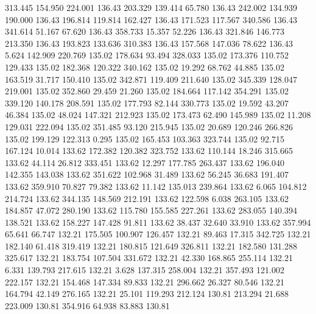  313.445  154.950  224.001       136.43
 203.329  139.414   65.780       136.43
 242.002  134.939  190.000       136.43
 196.814  119.814  162.427       136.43
 171.523  117.567  340.586       136.43
 341.614   51.167   67.620       136.43
 358.733   15.357   52.226       136.43
 321.846  146.773  213.350       136.43
 193.823  133.636  310.383       136.43
 157.568  147.036   78.622       136.43
   5.624  142.909  220.769       135.02
 178.634   93.494  328.033       135.02
 173.376  110.752  129.433       135.02
 182.368  120.322  340.162       135.02
  19.292   68.762   44.885       135.02
 163.519   31.717  150.410       135.02
 342.871  119.409  211.640       135.02
 345.339  128.047  219.001       135.02
 352.860   29.459   21.260       135.02
 184.664  117.142  354.291       135.02
 339.120  140.178  208.591       135.02
 177.793   82.144  330.773       135.02
  19.592   43.207   46.384       135.02
  48.024  147.321  212.923       135.02
 173.473   62.490  145.989       135.02
  11.208  129.031  222.094       135.02
 351.485   93.120  215.945       135.02
  20.689  120.246  266.826       135.02
 199.129  122.313    0.295       135.02
 165.453  103.363  323.744       135.02
  92.715  167.124   10.014       133.62
 172.382  120.382  323.752       133.62
 110.144   18.246  315.665       133.62
  44.114   26.812  333.451       133.62
  12.297  177.785  263.437       133.62
 196.040  142.355  143.038       133.62
 351.622  102.968   31.489       133.62
  56.245   36.683  191.407       133.62
 359.910   70.827   79.382       133.62
  11.142  135.013  239.864       133.62
   6.065  104.812  214.724       133.62
 344.135  148.569  212.191       133.62
 122.598    6.038  263.105       133.62
 184.857   47.072  280.190       133.62
 115.780  155.585  227.261       133.62
 283.055  140.394  138.521       133.62
 158.227  147.428   91.811       133.62
  38.437   32.640   33.910       133.62
 357.994   65.641   66.747       132.21
 175.505  100.907  126.457       132.21
  89.463   17.315  342.725       132.21
 182.140   61.418  319.419       132.21
 180.815  121.649  326.811       132.21
 182.580  131.288  325.617       132.21
 183.754  107.504  331.672       132.21
  42.330  168.865  255.114       132.21
   6.331  139.793  217.615       132.21
   3.628  137.315  258.004       132.21
 357.493  121.002  222.157       132.21
 154.468  147.334   89.833       132.21
 296.662   26.327   80.546       132.21
 164.794   42.149  276.165       132.21
  25.101  119.293  212.124       130.81
 213.294   21.688  223.009       130.81
 354.916   64.938   83.883       130.81
